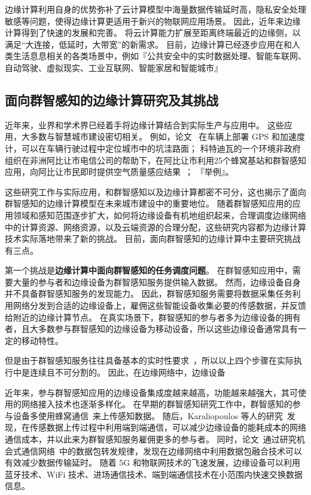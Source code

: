 边缘计算利用自身的优势弥补了云计算模型中海量数据传输延时高，隐私安全处理敏感等问题，使得边缘计算更适用于新兴的物联网应用场景。
因此，近年来边缘计算得到了快速的发展和完善。
将云计算能力扩展至距离终端最近的边缘侧，以满足“大连接，低延时，大带宽”的新需求。
目前，边缘计算已经逐步应用在和人类生活息息相关的各类场景中，例如『公共安全中的实时数据处理、智能车联网、自动驾驶、虚拟现实、工业互联网、智能家居和智能城市』

\subsection{面向群智感知的边缘计算研究及其挑战}

近年来，业界和学术界已经着手将边缘计算结合到实际生产与应用中。
这些应用，大多数与智慧城市建设密切相关。
例如，论文~\cite{DBLP:journals/cm/GantiYL11} 在车辆上部署 GPS 和加速度计，可以在车辆行驶过程中定位城市中的坑洼路面；
科特迪瓦的一个环境非政府组织在非洲阿比让市电信公司的帮助下，在阿比让市利用25个蜂窝基站和群智感知应用，向阿比让市民即时提供空气质量感应结果~\cite{}；
『举例』。

这些研究工作与实际应用，和群智感知以及边缘计算都密不可分，这也揭示了面向群智感知的边缘计算模型在未来城市建设中的重要地位。
随着群智感知应用的应用领域和感知范围逐步扩大，如何将边缘设备有机地组织起来，合理调度边缘网络中的计算资源、网络资源，以及云端资源的合理分配，这些研究内容都为边缘计算技术实际落地带来了新的挑战。
目前，面向群智感知的边缘计算中主要研究挑战有三点。

第一个挑战是\textbf{边缘计算中面向群智感知的任务调度问题}。
在群智感知应用中，需要大量的参与者和边缘设备为群智感知服务提供输入数据。
然而，边缘设备自身并不具备群智感知服务的发现能力。
因此，群智感知服务需要将数据采集任务利用网络分发到合适的边缘设备上，雇佣这些智能设备收集必要的传感数据，并反馈给附近的边缘计算节点。
在真实场景下，群智感知的参与者多为边缘设备的拥有者，且大多数参与群智感知的边缘设备为移动设备，所以这些边缘设备通常具有一定的移动特性。

但是由于群智感知服务往往具备基本的实时性要求~\cite{}，所以以上四个步骤在实际执行中是连续且不可分割的。
因此，在边缘网络中，边缘设备

近年来，参与群智感知应用的边缘设备集成度越来越高，功能越来越强大，其可使用的网络接入技术也逐渐多样化。
在早期的群智感知研究工作中，群智感知的参与设备多使用蜂窝通信~\cite{DBLP:conf/globecom/ZhangJLLC16,DBLP:conf/icdcs/XiaoWHHH16}来上传感知数据。
随后，Karaliopoulos 等人的研究~\cite{DBLP:conf/infocom/KaraliopoulosTK15}发现，在传感数据上传过程中利用端到端通信，可以减少边缘设备的能耗成本的网络通信成本，并以此来为群智感知服务雇佣更多的参与者。
同时，论文~\cite{DBLP:journals/tpds/ZhaoMTL15}通过研究机会式通信网络~\cite{}中的数据包转发规律，发现在边缘网络中利用数据包融合技术可以有效减少数据传输延时。
随着 5G 和物联网技术的飞速发展，边缘设备可以利用蓝牙技术、WiFi 技术、进场通信技术、端到端通信技术在小范围内快速交换数据信息。

